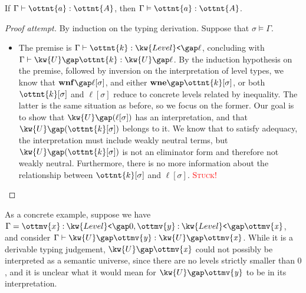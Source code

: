 \documentclass[a4paper,UKenglish,cleveref,autoref,thm-restate]{lipics-v2021}
\begin{document}
\begin{claim}[Soundness]
  If $ \Gamma  \vdash  \ottnt{a}  \mathrel{:}  \ottnt{A} $, then $ \Gamma  \vDash  \ottnt{a}  :  \ottnt{A} $.
\end{claim}

\begin{proof}[Proof attempt]
  By induction on the typing derivation.
  Suppose that $ \sigma  \vDash  \Gamma $.
  \begin{itemize}[topsep=0pt]
    \item \textit{}
      The premise is $ \Gamma  \vdash  \ottnt{k}  \mathrel{:}   \kw{Level}\texttt{<} \gap  \ell  $,
      concluding with $ \Gamma  \vdash   \kw{U} \gap  \ottnt{k}   \mathrel{:}   \kw{U} \gap  \ell  $.
      By the induction hypothesis on the premise,
      followed by inversion on the interpretation of level types,
      we know that $ \mathbf{wnf} \gap   \ell [  \sigma  ]  $, and either $ \mathbf{wne} \gap   \ottnt{k} [  \sigma  ]  $,
      or both $ \ottnt{k} [  \sigma  ] $ and $ \ell [  \sigma  ] $ reduce to concrete levels related by inequality.
      The latter is the same situation as before,
      so we focus on the former.
      Our goal is to show that $ \kw{U} \gap   (  \ell [  \sigma  ]  )  $ has an interpretation,
      and that $ \kw{U} \gap   (  \ottnt{k} [  \sigma  ]  )  $ belongs to it.
      We know that to satisfy adequacy,
      the interpretation must include weakly neutral terms,
      but $ \kw{U} \gap   (  \ottnt{k} [  \sigma  ]  )  $ is not an eliminator form and therefore not weakly neutral.
      Furthermore, there is no more information about the relationship
      between $ \ottnt{k} [  \sigma  ] $ and $ \ell [  \sigma  ] $.
      \textcolor{red}{\textsc{Stuck!}} \qedhere
  \end{itemize}
\end{proof}

As a concrete example,
suppose we have $\Gamma =   \ottmv{x}  \mathbin{:}   \kw{Level}\texttt{<} \gap   0    ,  \ottmv{y}  \mathbin{:}   \kw{Level}\texttt{<} \gap   \mathit{ \ottmv{x} }   $,
and consider $ \Gamma  \vdash   \kw{U} \gap   \mathit{ \ottmv{y} }    \mathrel{:}   \kw{U} \gap   \mathit{ \ottmv{x} }   $.
While it is a derivable typing judgement,
$ \kw{U} \gap   \mathit{ \ottmv{x} }  $ could not possibly be interpreted as a semantic universe,
since there are no levels strictly smaller than $0$,
and it is unclear what it would mean for $ \kw{U} \gap   \mathit{ \ottmv{y} }  $ to be in its interpretation.
\fi
\end{document}
